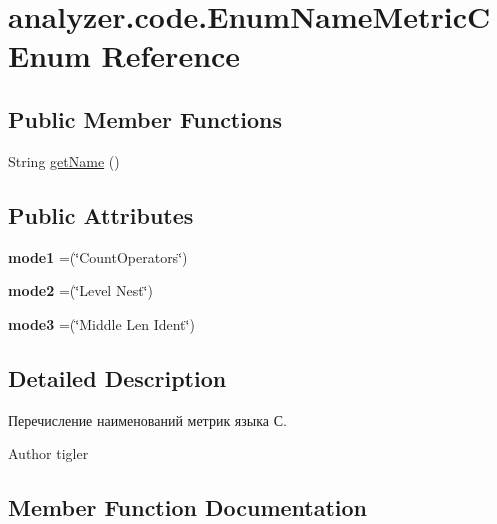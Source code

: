 \hypertarget{enumanalyzer_1_1code_1_1EnumNameMetricC}{}\section{analyzer.\+code.\+Enum\+Name\+MetricC Enum Reference}
\label{enumanalyzer_1_1code_1_1EnumNameMetricC}
\subsection*{Public Member Functions}
\begin{DoxyCompactItemize}
\item 
String \hyperlink{enumanalyzer_1_1code_1_1EnumNameMetricC_a4520d230bcc68d57f67d1bd2f6d009ba}{get\+Name} ()
\end{DoxyCompactItemize}
\subsection*{Public Attributes}
\begin{DoxyCompactItemize}
\item 
\mbox{\label{enumanalyzer_1_1code_1_1EnumNameMetricC_a093c21844bf187b178956b737b633f06}} 
{\bfseries mode1} =(\char`\"{}Count\+Operators\char`\"{})
\item 
\mbox{\label{enumanalyzer_1_1code_1_1EnumNameMetricC_a96288f32ed1267f33360f0d4a0c1cd72}} 
{\bfseries mode2} =(\char`\"{}Level Nest\char`\"{})
\item 
\mbox{\label{enumanalyzer_1_1code_1_1EnumNameMetricC_a3cd74e4e95ea10304281ec3d86c07c10}} 
{\bfseries mode3} =(\char`\"{}Middle Len Ident\char`\"{})
\end{DoxyCompactItemize}


\subsection{Detailed Description}
Перечисление наименований метрик языка С. \begin{DoxyAuthor}{Author}
tigler 
\end{DoxyAuthor}


\subsection{Member Function Documentation}
\mbox{\label{enumanalyzer_1_1code_1_1EnumNameMetricC_a4520d230bcc68d57f67d1bd2f6d009ba}} 
